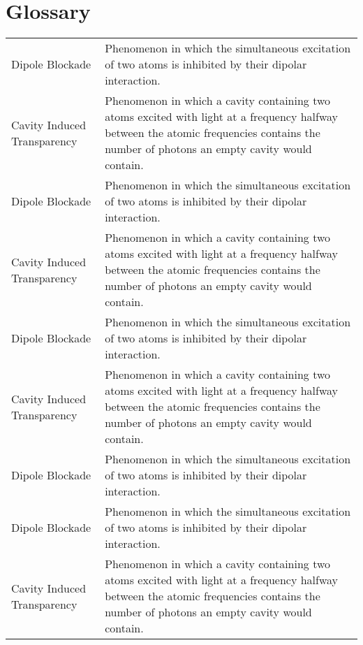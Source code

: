 \chapter*{Glossary}

\begin{center}
    \begin{longtable}{l p{}}
        Dipole Blockade             & Phenomenon in which the simultaneous excitation of two atoms is inhibited by their dipolar interaction.                                                                                  \\
        Cavity Induced Transparency & Phenomenon in which a cavity containing two atoms excited with light at a frequency halfway between the atomic frequencies contains the number of photons an empty cavity would contain. \\
        Dipole Blockade             & Phenomenon in which the simultaneous excitation of two atoms is inhibited by their dipolar interaction.                                                                                  \\
        Cavity Induced Transparency & Phenomenon in which a cavity containing two atoms excited with light at a frequency halfway between the atomic frequencies contains the number of photons an empty cavity would contain. \\
        Dipole Blockade             & Phenomenon in which the simultaneous excitation of two atoms is inhibited by their dipolar interaction.                                                                                  \\
        Cavity Induced Transparency & Phenomenon in which a cavity containing two atoms excited with light at a frequency halfway between the atomic frequencies contains the number of photons an empty cavity would contain. \\
        Dipole Blockade             & Phenomenon in which the simultaneous excitation of two atoms is inhibited by their dipolar interaction.                                                                                  \\
        Dipole Blockade             & Phenomenon in which the simultaneous excitation of two atoms is inhibited by their dipolar interaction.                                                                                  \\
        Cavity Induced Transparency & Phenomenon in which a cavity containing two atoms excited with light at a frequency halfway between the atomic frequencies contains the number of photons an empty cavity would contain. \\

\end{longtable}
\end{center}
